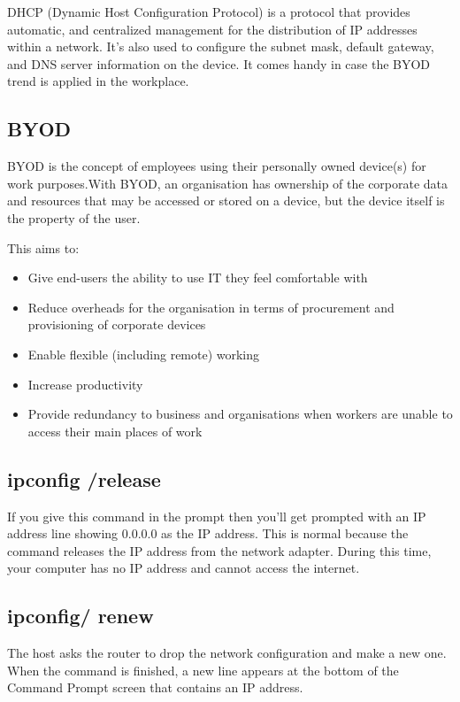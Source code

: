\documentclass[a4paper,12pt]{book}
\begin{document}
DHCP (Dynamic Host Configuration Protocol) is a protocol that provides automatic, and centralized management for the distribution of IP addresses within a network. It's also used to configure the subnet mask, default gateway, and DNS server information on the device. It comes handy in case the BYOD trend is applied in the workplace.

\subsection{BYOD}
BYOD is the concept of employees using their personally owned device(s) for work purposes.With BYOD, an organisation has ownership of the corporate data and resources that may be accessed or stored on a device, but the device itself is the property of the user.

\medskip

This aims to:
\begin{itemize}
\item{Give end-users the ability to use IT they feel comfortable with}
\item{Reduce overheads for the organisation in terms of procurement and provisioning of corporate devices}
\item{Enable flexible (including remote) working}
\item{Increase productivity}
\item{Provide redundancy to business and organisations when workers are unable to access their main places of work}
\end{itemize}

\subsection{ipconfig /release}

If you give this command in the prompt then you'll get prompted with an IP address line showing 0.0.0.0 as the IP address. This is normal because the command releases the IP address from the network adapter. During this time, your computer has no IP address and cannot access the internet.

\subsection{ipconfig/ renew}
The host asks the router to drop the network configuration and make a new one. When the command is finished, a new line appears at the bottom of the Command Prompt screen that contains an IP address.
\end{document}
